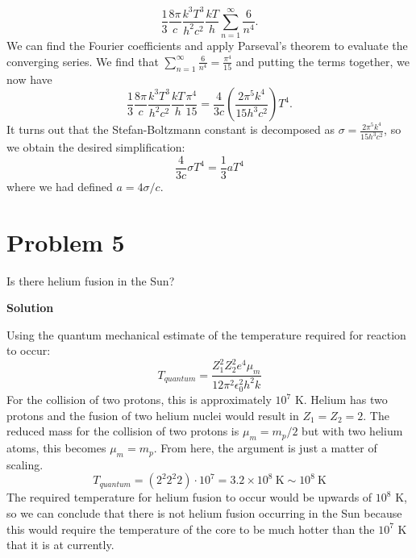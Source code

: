 \documentclass[12pt]{article}
\begin{document}
\begin{adjustwidth}{2.5em}{0pt}
\begin{siderules}
{ \begin{equation}
 \frac{1}{3}\frac{8\pi}{c}\frac{k^3 T^3}{h^2 c^2}\frac{kT}{h} \sum_{n=1}^{\infty} \frac{6}{n^4}.
 \end{equation}
 We can find the Fourier coefficients and apply Parseval's theorem to evaluate the converging series. We find that $\sum_{n=1}^{\infty} \frac{6}{n^4} = \frac{\pi^4}{15}$ and putting the terms together, we now have
 \begin{equation}
  \frac{1}{3}\frac{8\pi}{c}\frac{k^3 T^3}{h^2 c^2}\frac{kT}{h} \frac{\pi^4}{15} = \frac{4}{3c}\left(\frac{2\pi^5 k^4}{15h^3 c^2}\right) T^4.
 \end{equation}
 It turns out that the Stefan-Boltzmann constant is decomposed as $\sigma = \frac{2\pi^5 k^4}{15h^3 c^2}$, so we obtain the desired simplification:
 \begin{equation}
 \frac{4}{3c}\sigma T^4 = \frac{1}{3}aT^4
 \end{equation}
 where we had defined $a = 4\sigma/c$.
 }
\end{siderules}
\end{adjustwidth}

\section*{Problem 5}
Is there helium fusion in the Sun?

\setcounter{equation}{0}
\vspace{0.5cm}
\begin{adjustwidth}{2.5em}{0pt}
\begin{siderules}
 {\color{blue} \textbf{Solution}
 
 Using the quantum mechanical estimate of the temperature required for reaction to occur:
 \begin{equation}
 T_{quantum} = \frac{Z_1^2 Z_2^2 e^4 \mu_m}{12\pi^2 \epsilon_0^2 h^2 k}
 \end{equation}
 For the collision of two protons, this is approximately $10^7$ K. Helium has two protons and the fusion of two helium nuclei would result in $Z_1 = Z_2 = 2$. The reduced mass for the collision of two protons is $\mu_m = m_p/2$ but with two helium atoms, this becomes $\mu_m = m_p$. From here, the argument is just a matter of scaling.
 \begin{equation}
  T_{quantum} = (2^2 2^2 2)\cdot 10^7 = 3.2\times 10^8 ~\text{K}  \sim 10^8 ~\text{K}
 \end{equation}
 The required temperature for helium fusion to occur would be upwards of $10^8$ K, so we can conclude that there is not helium fusion occurring in the Sun because this would require the temperature of the core to be much hotter than the $10^7$ K that it is at currently.
 }
\end{siderules}
\end{adjustwidth}
\end{document}

